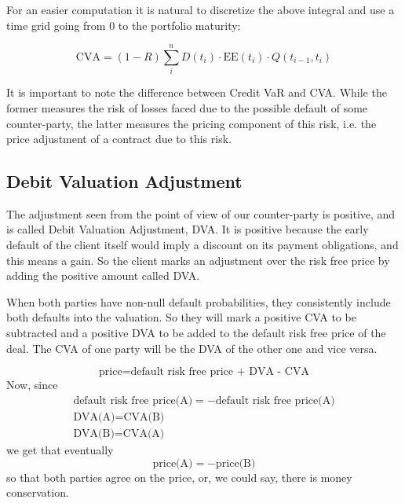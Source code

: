 For an easier computation it is natural to discretize the above integral and use a time grid going from 0 to the portfolio maturity:

\begin{equation}
\text{CVA} = (1-R) \sum_i^n D(t_i) \cdot \mathrm{EE}(t_i)\cdot Q(t_{i-1}, t_i)
\label{eq:cva_discrete}
\end{equation}

It is important to note the difference between Credit VaR and CVA. While the former measures the risk of losses faced due to the possible default of some counter-party, the latter measures the pricing component of this risk, i.e. the price adjustment of a contract due to this risk.

\subsection{Debit Valuation Adjustment}

The adjustment seen from the point of view of our counter-party is positive, and is called Debit Valuation Adjustment, DVA. It is positive because the early default of the client itself would imply a discount on its payment obligations, and this means a gain. So the client marks an adjustment over the risk free price by adding the positive amount called DVA. 

When both parties have non-null default probabilities, they consistently include both defaults into the valuation. So they will mark a positive CVA to be subtracted and a positive DVA to be added to the default risk free price of the deal. The CVA of one party will be the DVA of the other one and vice versa.

\begin{equation*}
\textrm{price}=\textrm{default risk free price + DVA - CVA}
\end{equation*}
Now, since
\begin{equation*}
\begin{gathered}
\textrm{default risk free price(A)} = - \textrm{default risk free price(A)} \\
\textrm{DVA(A)} = \textrm{CVA(B)} \\
\textrm{DVA(B)} = \textrm{CVA(A)} 
\end{gathered}
\end{equation*}
we get that eventually
\begin{equation*}
\textrm{price(A)} = -\textrm{price(B)}
\end{equation*}
so that both parties agree on the price, or, we could say, there is money conservation.

